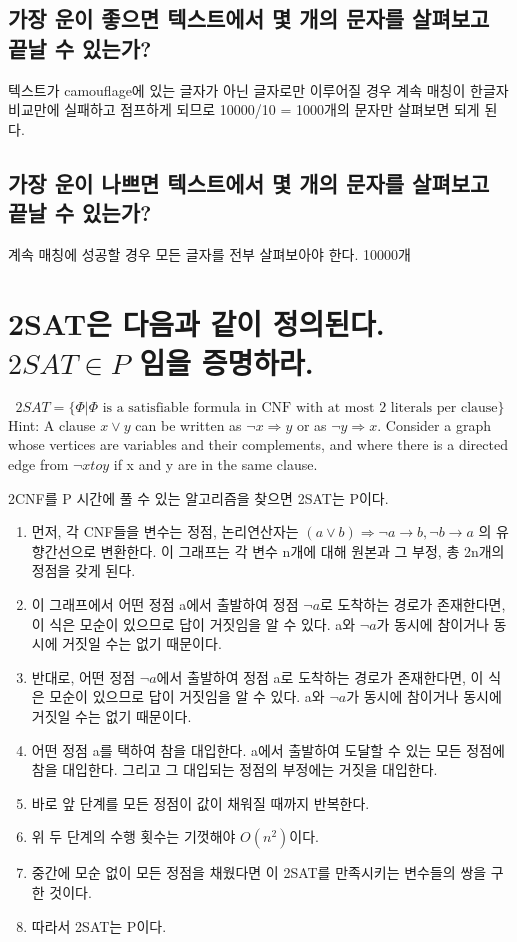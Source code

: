 \documentclass{article}
\begin{document}
\subsection{가장 운이 좋으면 텍스트에서 몇 개의 문자를 살펴보고 끝날 수 있는가?}
텍스트가 camouflage에 있는 글자가 아닌 글자로만 이루어질 경우 계속 매칭이 한글자 비교만에 실패하고 점프하게 되므로 10000/10 = 1000개의 문자만 살펴보면 되게 된다.
\subsection{가장 운이 나쁘면 텍스트에서 몇 개의 문자를 살펴보고 끝날 수 있는가?}
계속 매칭에 성공할 경우 모든 글자를 전부 살펴보아야 한다. 10000개

\section{2SAT은 다음과 같이 정의된다. $2SAT \in P$ 임을 증명하라.}
$$2SAT = \{ \Phi | \Phi \text{ is a satisfiable formula in CNF with at most 2 literals per clause}\}$$
Hint: A clause $x \lor y$ can be written as $\neg x \Rightarrow y$ or as $\neg y \Rightarrow x$. Consider a graph whose vertices are variables and their complements, and where there is a directed edge from $\neg x to y$ if x and y are in the same clause.

2CNF를 P 시간에 풀 수 있는 알고리즘을 찾으면 2SAT는 P이다.
\begin{enumerate}
    \item 먼저, 각 CNF들을 변수는 정점, 논리연산자는 $(a \lor b) \Rightarrow \neg a \to b, \neg b \to a$ 의 유향간선으로 변환한다. 이 그래프는 각 변수 n개에 대해 원본과 그 부정, 총 2n개의 정점을 갖게 된다.
    \item 이 그래프에서 어떤 정점 a에서 출발하여 정점 $\neg a$로 도착하는 경로가 존재한다면, 이 식은 모순이 있으므로 답이 거짓임을 알 수 있다. a와 $\neg a$가 동시에 참이거나 동시에 거짓일 수는 없기 때문이다.
    \item 반대로, 어떤 정점 $\neg a$에서 출발하여 정점 a로 도착하는 경로가 존재한다면, 이 식은 모순이 있으므로 답이 거짓임을 알 수 있다. a와 $\neg a$가 동시에 참이거나 동시에 거짓일 수는 없기 때문이다. 
    \item 어떤 정점 a를 택하여 참을 대입한다. a에서 출발하여 도달할 수 있는 모든 정점에 참을 대입한다. 그리고 그 대입되는 정점의 부정에는 거짓을 대입한다.
    \item 바로 앞 단계를 모든 정점이 값이 채워질 때까지 반복한다.
    \item 위 두 단계의 수행 횟수는 기껏해야 $O(n^2)$이다.
    \item 중간에 모순 없이 모든 정점을 채웠다면 이 2SAT를 만족시키는 변수들의 쌍을 구한 것이다.
    \item 따라서 2SAT는 P이다.
\end{enumerate}
\end{document}
